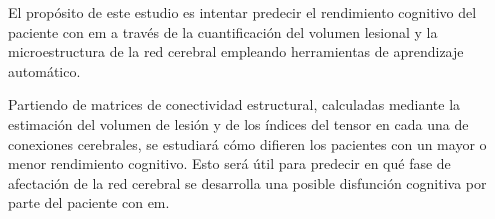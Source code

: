 El propósito de este estudio es intentar predecir el rendimiento cognitivo del paciente con \gls{em} a través de la cuantificación del volumen lesional y la microestructura de la red cerebral empleando herramientas de aprendizaje automático. 

Partiendo de matrices de conectividad estructural, calculadas mediante la estimación del volumen de lesión y de los índices del tensor en cada una de conexiones cerebrales, se estudiará cómo difieren los pacientes con un mayor o menor rendimiento cognitivo. Esto será útil para predecir en qué fase de afectación de la red cerebral se desarrolla una posible disfunción cognitiva por parte del paciente con \gls{em}.